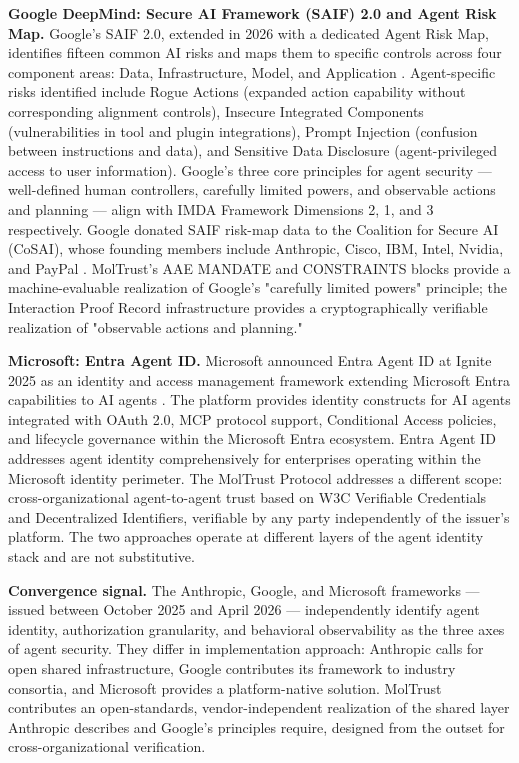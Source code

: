 \textbf{Google DeepMind: Secure AI Framework (SAIF) 2.0 and Agent Risk Map.} Google's SAIF 2.0, extended in 2026 with a dedicated Agent Risk Map, identifies fifteen common AI risks and maps them to specific controls across four component areas: Data, Infrastructure, Model, and Application \cite{ref12_google}. Agent-specific risks identified include Rogue Actions (expanded action capability without corresponding alignment controls), Insecure Integrated Components (vulnerabilities in tool and plugin integrations), Prompt Injection (confusion between instructions and data), and Sensitive Data Disclosure (agent-privileged access to user information). Google's three core principles for agent security — well-defined human controllers, carefully limited powers, and observable actions and planning — align with IMDA Framework Dimensions 2, 1, and 3 respectively. Google donated SAIF risk-map data to the Coalition for Secure AI (CoSAI), whose founding members include Anthropic, Cisco, IBM, Intel, Nvidia, and PayPal \cite{ref24_cosai}. MolTrust's AAE MANDATE and CONSTRAINTS blocks provide a machine-evaluable realization of Google's "carefully limited powers" principle; the Interaction Proof Record infrastructure provides a cryptographically verifiable realization of "observable actions and planning."


\textbf{Microsoft: Entra Agent ID.} Microsoft announced Entra Agent ID at Ignite 2025 as an identity and access management framework extending Microsoft Entra capabilities to AI agents \cite{ref25_entra}. The platform provides identity constructs for AI agents integrated with OAuth 2.0, MCP protocol support, Conditional Access policies, and lifecycle governance within the Microsoft Entra ecosystem. Entra Agent ID addresses agent identity comprehensively for enterprises operating within the Microsoft identity perimeter. The MolTrust Protocol addresses a different scope: cross-organizational agent-to-agent trust based on W3C Verifiable Credentials and Decentralized Identifiers, verifiable by any party independently of the issuer's platform. The two approaches operate at different layers of the agent identity stack and are not substitutive.


\textbf{Convergence signal.} The Anthropic, Google, and Microsoft frameworks — issued between October 2025 and April 2026 — independently identify agent identity, authorization granularity, and behavioral observability as the three axes of agent security. They differ in implementation approach: Anthropic calls for open shared infrastructure, Google contributes its framework to industry consortia, and Microsoft provides a platform-native solution. MolTrust contributes an open-standards, vendor-independent realization of the shared layer Anthropic describes and Google's principles require, designed from the outset for cross-organizational verification.


